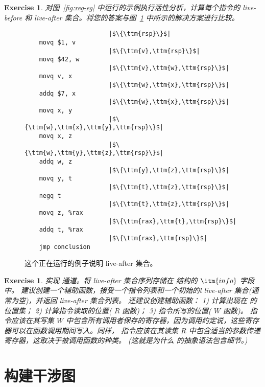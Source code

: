 \documentclass[11pt]{book}
\newtheorem{exercise}[theorem]{Exercise}
\begin{document}
\begin{exercise}\normalfont
  对图~\ref{fig:reg-eg} 中运行的示例执行活性分析，计算每个指令的 live-before 和 live-after 集合。将您的答案与图~\ref{fig:live-eg} 中所示的解决方案进行比较。
\end{exercise}

\begin{figure}[tp]
\hspace{20pt}
\begin{minipage}{0.45\textwidth}
\begin{lstlisting}
                       |$\{\ttm{rsp}\}$|    
    movq $1, v
                       |$\{\ttm{v},\ttm{rsp}\}$|    
    movq $42, w
                       |$\{\ttm{v},\ttm{w},\ttm{rsp}\}$|    
    movq v, x
                       |$\{\ttm{w},\ttm{x},\ttm{rsp}\}$|    
    addq $7, x
                       |$\{\ttm{w},\ttm{x},\ttm{rsp}\}$|    
    movq x, y
                       |$\{\ttm{w},\ttm{x},\ttm{y},\ttm{rsp}\}$|    
    movq x, z
                       |$\{\ttm{w},\ttm{y},\ttm{z},\ttm{rsp}\}$|    
    addq w, z
                       |$\{\ttm{y},\ttm{z},\ttm{rsp}\}$|
    movq y, t
                       |$\{\ttm{t},\ttm{z},\ttm{rsp}\}$|    
    negq t
                       |$\{\ttm{t},\ttm{z},\ttm{rsp}\}$|    
    movq z, %rax
                       |$\{\ttm{rax},\ttm{t},\ttm{rsp}\}$|    
    addq t, %rax
                       |$\{\ttm{rax},\ttm{rsp}\}$|
    jmp conclusion
\end{lstlisting}
\end{minipage}

\caption{这个正在运行的例子说明 live-after 集合。}
\label{fig:live-eg}
\end{figure}

\begin{exercise}\normalfont
实现  通道。将 live-after 集合序列存储在 
结构的 $\itm{info}$ 字段中。
%
建议创建一个辅助函数，接受一个指令列表和一个初始的l live-after 集合(通常为空)，并返回 live-after 集合列表。
%
还建议创建辅助函数： 1) 计算出现在 \Arg{} 的位置集； 2) 计算指令读取的位置( $R$ 函数)； 3) 指令所写的位置( $W$ 函数)。  指令应该在其写集 $W$ 中包含所有调用者保存的寄存器，因为调用约定说，这些寄存器可以在函数调用期间写入。同样，  指令应该在其读集 $R$ 中包含适当的参数传递寄存器，这取决于被调用函数的种类。 (这就是为什么  的抽象语法包含细节。)
\end{exercise}

\clearpage

\section{构建干涉图}
\label{sec:build-interference}
\end{document}
